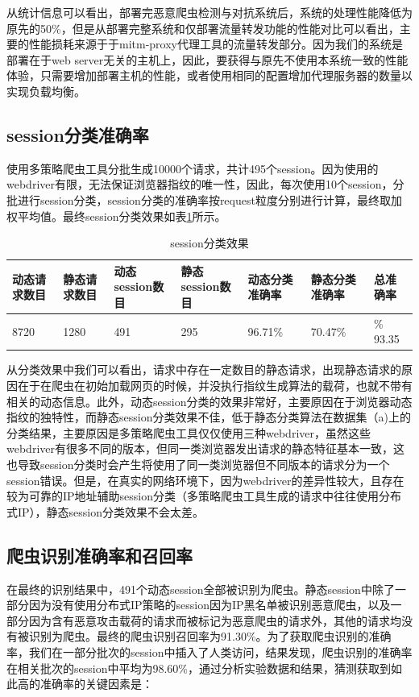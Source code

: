 \documentclass[doctor,privacy,twoside]{buaa_mac}
\begin{document}
从统计信息可以看出，部署完恶意爬虫检测与对抗系统后，系统的处理性能降低为原先的50\%，但是从部署完整系统和仅部署流量转发功能的性能对比可以看出，主要的性能损耗来源于于mitm-proxy代理工具的流量转发部分。因为我们的系统是部署在于web server无关的主机上，因此，要获得与原先不使用本系统一致的性能体验，只需要增加部署主机的性能，或者使用相同的配置增加代理服务器的数量以实现负载均衡。



\subsection{session分类准确率}
使用多策略爬虫工具分批生成10000个请求，共计495个session。因为使用的webdriver有限，无法保证浏览器指纹的唯一性，因此，每次使用10个session，分批进行session分类，session分类的准确率按request粒度分别进行计算，最终取加权平均值。最终session分类效果如表\ref{tab:session-res}所示。

\begin{table}[h]
  \caption{session分类效果}
  \label{tab:session-res}
  \centering
\begin{tabular}{|p{1.5cm}<{\centering}|p{1.5cm}<{\centering}|p{1.5cm}<{\centering}|p{1.5cm}<{\centering}|p{1.5cm}<{\centering}|p{1.5cm}<{\centering}|p{1.5cm}<{\centering}|}
    \hline
  动态请求数目 &  静态请求数目 & 动态session数目 &  静态session数目  & 动态分类准确率  & 静态分类准确率  & 总准确率 \\
    \hline
8720 & 1280 & 491 & 295 & 96.71\% & 70.47\% & \% 93.35\\

\hline
    \end{tabular}
\end{table}


从分类效果中我们可以看出，请求中存在一定数目的静态请求，出现静态请求的原因在于在爬虫在初始加载网页的时候，并没执行指纹生成算法的载荷，也就不带有相关的动态信息。此外，动态session分类的效果非常好，主要原因在于浏览器动态指纹的独特性，而静态session分类效果不佳，低于静态分类算法在数据集（a)上的分类结果，主要原因是多策略爬虫工具仅仅使用三种webdriver，虽然这些webdriver有很多不同的版本，但同一类浏览器发出请求的静态特征基本一致，这也导致session分类时会产生将使用了同一类浏览器但不同版本的请求分为一个session错误。但是，在真实的网络环境下，因为webdriver的差异性较大，且存在较为可靠的IP地址辅助session分类（多策略爬虫工具生成的请求中往往使用分布式IP），静态session分类效果不会太差。


\subsection{爬虫识别准确率和召回率}
在最终的识别结果中，491个动态session全部被识别为爬虫。静态session中除了一部分因为没有使用分布式IP策略的session因为IP黑名单被识别恶意爬虫，以及一部分因为含有恶意攻击载荷的请求而被标记为恶意爬虫的请求外，其他的请求均没有被识别为爬虫。最终的爬虫识别召回率为91.30\%。为了获取爬虫识别的准确率，我们在一部分批次的session中插入了人类访问，结果发现，爬虫识别的准确率在相关批次的session中平均为98.60\%，通过分析实验数据和结果，猜测获取到如此高的准确率的关键因素是：
\end{document}
